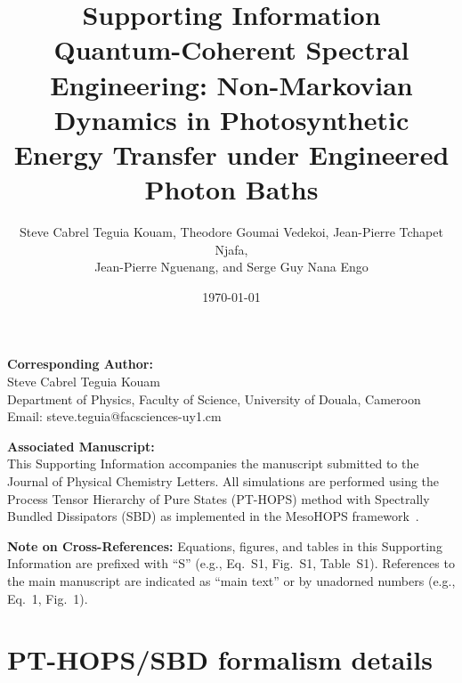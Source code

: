 \documentclass[11pt,a4paper]{article}
\begin{document}
\title{\textbf{Supporting Information}\\[0.5em]
\large Quantum-Coherent Spectral Engineering: Non-Markovian Dynamics in Photosynthetic Energy Transfer under Engineered Photon Baths}

\author{Steve Cabrel Teguia Kouam, Theodore Goumai Vedekoi, Jean-Pierre Tchapet Njafa,\\ Jean-Pierre Nguenang, and Serge Guy Nana Engo}

\date{\today}

\maketitle

\noindent\textbf{Corresponding Author:}\\
Steve Cabrel Teguia Kouam\\
Department of Physics, Faculty of Science, University of Douala, Cameroon\\
Email: steve.teguia@facsciences-uy1.cm

\vspace{1em}
\noindent\textbf{Associated Manuscript:}\\
This Supporting Information accompanies the manuscript submitted to the Journal of Physical Chemistry Letters. All simulations are performed using the Process Tensor Hierarchy of Pure States (PT-HOPS) method with Spectrally Bundled Dissipators (SBD) as implemented in the MesoHOPS framework~\cite{Varvelo2021a,Citty2024a}.

\tableofcontents

\newpage

\noindent\textbf{Note on Cross-References:} Equations, figures, and tables in this Supporting Information are prefixed with ``S'' (e.g., Eq.~S1, Fig.~S1, Table~S1). References to the main manuscript are indicated as ``main text'' or by unadorned numbers (e.g., Eq.~1, Fig.~1).

\vspace{1em}


\section{PT-HOPS/SBD formalism details}
\label{sec:formalism}
\end{document}
